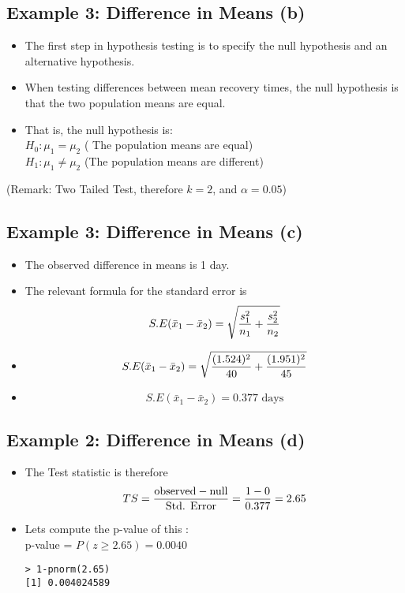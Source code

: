 \begin{frame}
\subsection*{Example 3: Difference in Means (b) }
\begin{itemize}
\item
The first step in hypothesis testing is to specify the null hypothesis and an alternative hypothesis.
\item When testing differences between mean recovery times, the null hypothesis is that the two population means are equal.
\item That is, the null hypothesis is:\\
$H_0: \mu_1 = \mu_2$ ( The population means are equal)\\
$H_1: \mu_1 \neq \mu_2$ (The population means are different)\\
\end{itemize}
(Remark: Two Tailed Test, therefore $k = 2$, and $\alpha = 0.05$)



\subsection*{Example 3: Difference in Means (c) }
\begin{itemize}
\item The observed difference in means is 1 day.
\item The relevant formula for the standard error is
\[ S.E(\bar{x}_1 - \bar{x}_2) = \sqrt{{s^2_1\over n_1}+{s^2_2 \over n_2}} \]
\item  \[ S.E(\bar{x}_1 - \bar{x}_2) = \sqrt{{(1.524)^2 \over 40}+{(1.951)^2 \over 45}}   \]
\item  \[ S.E(\bar{x}_1 - \bar{x}_2) = 0.377\mbox{ days}\]
\end{itemize}


\begin{frame}[fragile]
\subsection*{Example 2: Difference in Means (d) }
\begin{itemize}
\item The Test statistic is therefore
\[ TS = {\mbox{observed} - \mbox{null} \over \mbox{Std. Error}}  = {1 - 0 \over 0.377 } = 2.65 \]
\item Lets compute the p-value of this : \\
p-value = $P(z \geq 2.65) = 0.0040$
\begin{verbatim}
> 1-pnorm(2.65)
[1] 0.004024589
\end{verbatim}


\end{itemize}
\end{frame}
\end{frame}
